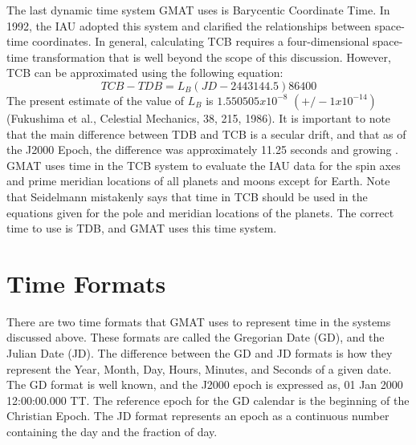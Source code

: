 The last dynamic time system GMAT uses is Barycentic Coordinate
Time.  In 1992, the IAU adopted this system and clarified the
relationships between space-time coordinates\cite{seidelmann}.  In
general, calculating TCB requires a four-dimensional space-time
transformation that is well beyond the scope of this discussion.
However, TCB can be approximated using the following equation:
%
\begin{equation}
 TCB - TDB = L_B  (JD - 2443144.5)  86400
 \end{equation}
%
The present estimate of the value of $L_B$ is $1.550505 x 10^{-8}$
$(+/- 1 x 10^{-14})$ (Fukushima et al., Celestial Mechanics, 38,
215, 1986).  It is important to note that the main difference
between TDB and TCB is a secular drift, and that as of the J2000
Epoch, the difference was approximately 11.25 seconds and growing
\cite{Seidelmann:etal:92}. GMAT uses time in the TCB system to
evaluate the IAU data  for the spin axes and prime meridian
locations of all planets and moons except for
Earth.\cite{Seidelmann:etal:02}  Note that
Seidelmann\cite{Seidelmann:etal:02} mistakenly says that time in TCB
should be used in the equations given for the  pole and meridian
locations of the planets.  The correct time to use is TDB, and GMAT
uses this time system.

\section{Time Formats}  \label{Sec:TimeFormats}

There are two time formats that GMAT uses to represent time in the
systems discussed above.  These formats are called the Gregorian
Date (GD), and the Julian Date (JD).  The difference between the GD
and JD formats is how they represent the Year, Month, Day, Hours,
Minutes, and Seconds of a given date.  The GD format is well known,
and the J2000 epoch is expressed as, 01 Jan 2000 12:00:00.000 TT.
The reference epoch for the GD calendar is the beginning of the
Christian Epoch.  The JD format represents an epoch as a continuous
number containing the day and the fraction of day.

